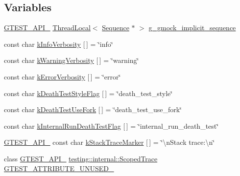 \subsection*{Variables}
\begin{DoxyCompactItemize}
\item 
\hyperlink{gtest-port_8h_aa73be6f0ba4a7456180a94904ce17790}{G\+T\+E\+S\+T\+\_\+\+A\+P\+I\+\_\+} \hyperlink{classtesting_1_1internal_1_1_thread_local}{Thread\+Local}$<$ \hyperlink{classtesting_1_1_sequence}{Sequence} $\ast$ $>$ \hyperlink{namespacetesting_1_1internal_af4407fe8aeb1e43b2f58940736a20590}{g\+\_\+gmock\+\_\+implicit\+\_\+sequence}
\item 
const char \hyperlink{namespacetesting_1_1internal_a96274a788ffc75a6dffdfa8aa1f34fb9}{k\+Info\+Verbosity} \mbox{[}$\,$\mbox{]} = \char`\"{}info\char`\"{}
\item 
const char \hyperlink{namespacetesting_1_1internal_ad9386ccda6b6deac2f7b84784d3088c0}{k\+Warning\+Verbosity} \mbox{[}$\,$\mbox{]} = \char`\"{}warning\char`\"{}
\item 
const char \hyperlink{namespacetesting_1_1internal_a3d730761274e7b80dd66e5014171fcb5}{k\+Error\+Verbosity} \mbox{[}$\,$\mbox{]} = \char`\"{}error\char`\"{}
\item 
const char \hyperlink{namespacetesting_1_1internal_a008ebfe0c0347d65e5e06e4d310981b3}{k\+Death\+Test\+Style\+Flag} \mbox{[}$\,$\mbox{]} = \char`\"{}death\+\_\+test\+\_\+style\char`\"{}
\item 
const char \hyperlink{namespacetesting_1_1internal_a32051e2574562b548be3e26a52eaa553}{k\+Death\+Test\+Use\+Fork} \mbox{[}$\,$\mbox{]} = \char`\"{}death\+\_\+test\+\_\+use\+\_\+fork\char`\"{}
\item 
const char \hyperlink{namespacetesting_1_1internal_a8572303d929880adf30db00952e1c45d}{k\+Internal\+Run\+Death\+Test\+Flag} \mbox{[}$\,$\mbox{]} = \char`\"{}internal\+\_\+run\+\_\+death\+\_\+test\char`\"{}
\item 
\hyperlink{gtest-port_8h_aa73be6f0ba4a7456180a94904ce17790}{G\+T\+E\+S\+T\+\_\+\+A\+P\+I\+\_\+} const char \hyperlink{namespacetesting_1_1internal_abb38528ca6a45df265b19f5ccb3d16d9}{k\+Stack\+Trace\+Marker} \mbox{[}$\,$\mbox{]} = \char`\"{}\textbackslash{}n\+Stack trace\+:\textbackslash{}n\char`\"{}
\item 
class \hyperlink{gtest-port_8h_aa73be6f0ba4a7456180a94904ce17790}{G\+T\+E\+S\+T\+\_\+\+A\+P\+I\+\_\+} \hyperlink{classtesting_1_1internal_1_1_scoped_trace}{testing\+::internal\+::\+Scoped\+Trace} \hyperlink{namespacetesting_1_1internal_a581ac897511489c75a06aa328dcfb62f}{G\+T\+E\+S\+T\+\_\+\+A\+T\+T\+R\+I\+B\+U\+T\+E\+\_\+\+U\+N\+U\+S\+E\+D\+\_\+}

\end{DoxyCompactItemize}
